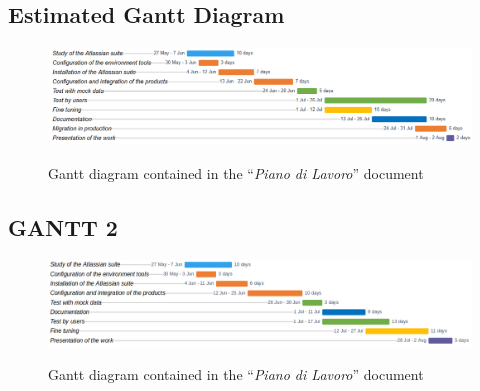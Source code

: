 \begin{landscape}
	\vspace*{\fill}
	\section{Estimated Gantt Diagram}
	\label{gantt_1}
	\begin{figure}[H]
		\centering
		\includegraphics[width=22cm]{resources/work_plan_gantt}\\
		\caption{Gantt diagram contained in the ``\textit{Piano di Lavoro}'' document}
	\end{figure}
	\vspace*{\fill}
\end{landscape}
\newpage
\begin{landscape}
	\vspace*{\fill}
	\section{GANTT 2}
	\label{gantt_2}
	\begin{figure}[H]
		\centering
		\includegraphics[width=22cm]{resources/revised_gantt}\\
		\caption{Gantt diagram contained in the ``\textit{Piano di Lavoro}'' document}
	\end{figure}
	\vspace*{\fill}
\end{landscape}
